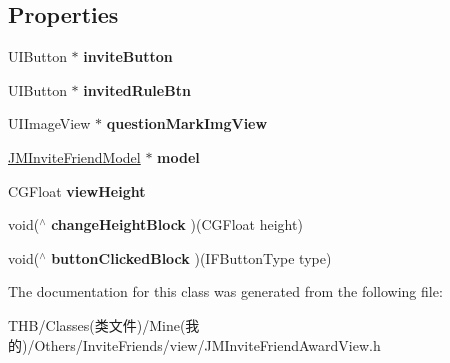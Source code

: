 \subsection*{Properties}
\begin{DoxyCompactItemize}
\item 
\mbox{\label{interface_j_m_invite_friend_award_view_ab8cc022bf4501aedc20ffa0705f66af6}} 
U\+I\+Button $\ast$ {\bfseries invite\+Button}
\item 
\mbox{\label{interface_j_m_invite_friend_award_view_a9bfd8edfcd3efba2d52911619876a196}} 
U\+I\+Button $\ast$ {\bfseries invited\+Rule\+Btn}
\item 
\mbox{\label{interface_j_m_invite_friend_award_view_ac12545d3ebd77866b96c6a972e867847}} 
U\+I\+Image\+View $\ast$ {\bfseries question\+Mark\+Img\+View}
\item 
\mbox{\label{interface_j_m_invite_friend_award_view_a6a5dc5aa42ae965ff4c1bc86482ebb1d}} 
\mbox{\hyperlink{interface_j_m_invite_friend_model}{J\+M\+Invite\+Friend\+Model}} $\ast$ {\bfseries model}
\item 
\mbox{\label{interface_j_m_invite_friend_award_view_a0b74c0ad73ffc33d6fa65550cc4dedb7}} 
C\+G\+Float {\bfseries view\+Height}
\item 
\mbox{\label{interface_j_m_invite_friend_award_view_a4eeecff92fe6cfa3c8488fc36c9eefc9}} 
void($^\wedge$ {\bfseries change\+Height\+Block} )(C\+G\+Float height)
\item 
\mbox{\label{interface_j_m_invite_friend_award_view_a09dd683e7bd28a835138d6c9471bc42d}} 
void($^\wedge$ {\bfseries button\+Clicked\+Block} )(I\+F\+Button\+Type type)
\end{DoxyCompactItemize}


The documentation for this class was generated from the following file\+:\begin{DoxyCompactItemize}
\item 
T\+H\+B/\+Classes(类文件)/\+Mine(我的)/\+Others/\+Invite\+Friends/view/J\+M\+Invite\+Friend\+Award\+View.\+h\end{DoxyCompactItemize}
